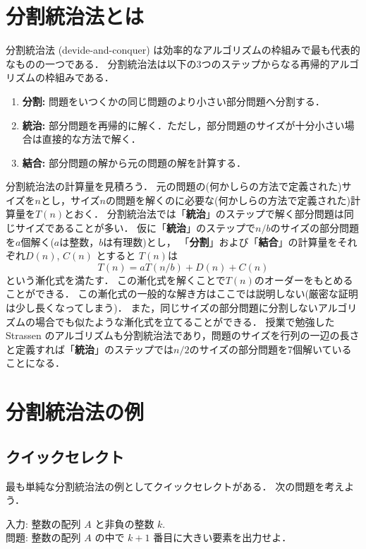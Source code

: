 \documentclass[a4paper,twoside,onecolumn,openany,article]{memoir}
\theoremstyle{remark}
\begin{document}
\section{分割統治法とは}
分割統治法 (devide-and-conquer) は効率的なアルゴリズムの枠組みで最も代表的なものの一つである．
分割統治法は以下の3つのステップからなる再帰的アルゴリズムの枠組みである．
\begin{enumerate}
\item \textbf{分割:} 問題をいつくかの同じ問題のより小さい部分問題へ分割する．
\item \textbf{統治:} 部分問題を再帰的に解く．ただし，部分問題のサイズが十分小さい場合は直接的な方法で解く．
\item \textbf{結合:} 部分問題の解から元の問題の解を計算する．
\end{enumerate}
分割統治法の計算量を見積ろう．
元の問題の(何かしらの方法で定義された)サイズを$n$とし，サイズ$n$の問題を解くのに必要な(何かしらの方法で定義された)計算量を$T(n)$とおく．
分割統治法では「\textbf{統治}」のステップで解く部分問題は同じサイズであることが多い．
仮に「\textbf{統治}」のステップで$n/b$のサイズの部分問題を$a$個解く($a$は整数，$b$は有理数)とし，
「\textbf{分割}」および「\textbf{結合}」の計算量をそれぞれ$D(n)$, $C(n)$ とすると
$T(n)$は
\begin{equation*}
T(n) = aT(n/b) + D(n) + C(n)
\end{equation*}
という漸化式を満たす．
この漸化式を解くことで$T(n)$のオーダーをもとめることができる．
この漸化式の一般的な解き方はここでは説明しない(厳密な証明は少し長くなってしまう)．
また，同じサイズの部分問題に分割しないアルゴリズムの場合でも似たような漸化式を立てることができる．
%
授業で勉強した Strassen のアルゴリズムも分割統治法であり，問題のサイズを行列の一辺の長さと定義すれば「\textbf{統治}」のステップでは$n/2$のサイズの部分問題を7個解いていることになる．


\section{分割統治法の例}
\subsection{クイックセレクト}
最も単純な分割統治法の例としてクイックセレクトがある．
次の問題を考えよう．

\vspace{1em}
\noindent
入力: 整数の配列 $A$ と非負の整数 $k$.\\
問題: 整数の配列 $A$ の中で $k+1$ 番目に大きい要素を出力せよ．
\end{document}
